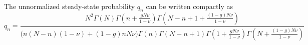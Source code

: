 %
The unnormalized steady-state probability $q_n$ can be written compactly as%
\begin{equation*}%
q_n = \frac{ N^2\Gamma(N) \Gamma\left(n+\frac{g N\nu}{1-\nu}\right) \Gamma\left(N-n+1+\frac{(1-g) N\nu}{1-\nu}\right) }{ \big(n(N-n)(1-\nu)+(1-g)n N\nu\big) \Gamma(n) \Gamma(N-n+1) \Gamma\left(1+\frac{g N\nu}{1-\nu}\right) \Gamma\left(N+\frac{(1-g) N\nu}{1-\nu}\right)}
\end{equation*}
